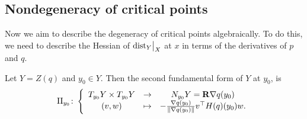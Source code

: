 \subsection{Nondegeneracy of critical points}

Now we aim to describe the degeneracy of critical points algebraically. To do this, we need to describe the Hessian of $\mathord{\operatorname{dist}}_Y\big|_X$ at $x$ in terms of the derivatives of $p$ and $q$. 

\begin{lemma}
\label{D!L:II}
  Let $Y = Z(q)$ and $y_0 \in Y$. Then the second fundamental form of $Y$ at $y_0$, is
  \[
    \textnormal{II}_{y_0} \colon \left\{ \begin{array}{ccc}
      T_{y_0} Y \times T_{y_0} Y & \to & N_{y_0} Y = \mathbf{R} \nabla q(y_0) \\
      (v, w) & \mapsto & -\frac{\nabla q(y_0)}{\| \nabla q(y_0) \|} v^\top H(q)(y_0) w.
    \end{array} \right.
  \]
\end{lemma}

